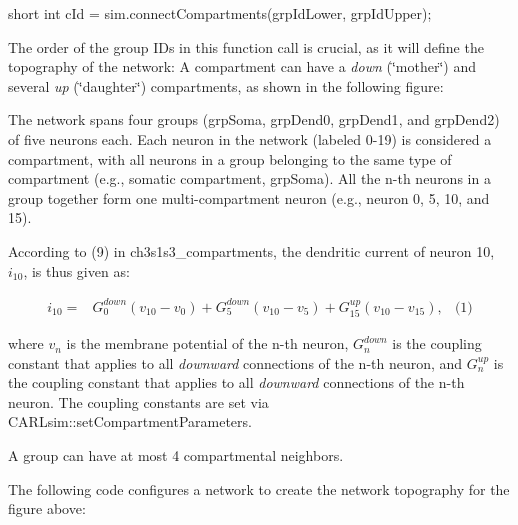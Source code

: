 \begin{DoxyCode}
\textcolor{keywordtype}{short} \textcolor{keywordtype}{int} cId = sim.connectCompartments(grpIdLower, grpIdUpper);
\end{DoxyCode}


The order of the group I\+Ds in this function call is crucial, as it will define the topography of the network\+: A compartment can have a {\itshape down} (\char`\"{}mother\char`\"{}) and several {\itshape up} (\char`\"{}daughter\char`\"{}) compartments, as shown in the following figure\+:

 The network spans four groups ({\ttfamily grp\+Soma}, {\ttfamily grp\+Dend0}, {\ttfamily grp\+Dend1}, and {\ttfamily grp\+Dend2}) of five neurons each. Each neuron in the network (labeled 0-\/19) is considered a compartment, with all neurons in a group belonging to the same type of compartment (e.\+g., somatic compartment, {\ttfamily grp\+Soma}). All the n-\/th neurons in a group together form one multi-\/compartment neuron (e.\+g., neuron 0, 5, 10, and 15).

According to (9) in ch3s1s3\+\_\+compartments, the dendritic current of neuron 10, $i_{10}$, is thus given as\+:

\begin{align*} i_{10} = & G_0^{down} (v_{10} - v_{0}) + G_5^{down} (v_{10} - v_{5}) + G_{15}^{up} (v_{10} - v_{15}), & \text{(1)} \end{align*}

where $v_n$ is the membrane potential of the n-\/th neuron, $G_n^{down}$ is the coupling constant that applies to all {\itshape downward} connections of the n-\/th neuron, and $G_n^{up}$ is the coupling constant that applies to all {\itshape downward} connections of the n-\/th neuron. The coupling constants are set via C\+A\+R\+Lsim\+::set\+Compartment\+Parameters.

A group can have at most 4 compartmental neighbors.

The following code configures a network to create the network topography for the figure above\+:


